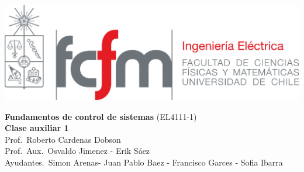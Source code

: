 \documentclass[
  11pt,
  letterpaper,
   addpoints,
   answers
  ]{exam}
\begin{document}
\noindent
\begin{minipage}{0.47\textwidth}
\includegraphics[width=\textwidth]{../fcfm_die}
\end{minipage}
\begin{minipage}{0.53\textwidth}
\begin{center} 
\large\textbf{Fundamentos de control de sistemas} (EL4111-1) \\
\large\textbf{Clase auxiliar 1} \\
\small Prof.~Roberto Cardenas Dobson\\
\small Prof.~Aux.~Osvaldo Jimenez - Erik Sáez\\
\small Ayudantes.~Simon Arenas- Juan Pablo Baez - Francisco Garces - Sofia Ibarra\\
\end{center}
\end{minipage}

\vspace{0.5cm}
\noindent
\vspace{.85cm}
\end{document}
